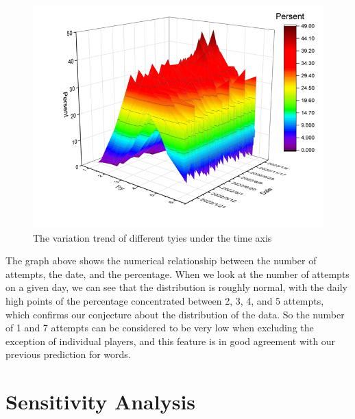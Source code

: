 \documentclass[12pt]{article}  %
\begin{document}
\begin{figure}[htbp]
\centering
\includegraphics[width=.5\textwidth]{img/insight2.png}
\caption{The variation trend of different tyies under the time axis}\label{fig:insight1}
\end{figure}

The graph above shows the numerical relationship between the number of attempts, the date, and the percentage. When we look at the number of attempts on a given day, we can see that the distribution is roughly normal, with the daily high points of the percentage concentrated between 2, 3, 4, and 5 attempts, which confirms our conjecture about the distribution of the data. So the number of 1 and 7 attempts can be considered to be very low when excluding the exception of individual players, and this feature is in good agreement with our previous prediction for words.

\clearpage

\section{Sensitivity Analysis}
\end{document}

